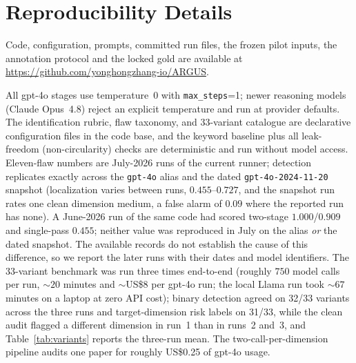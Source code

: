 \section{Reproducibility Details}
\label{app:repro}
\begin{sloppypar}\noindent Code, configuration, prompts, committed run files, the
frozen pilot inputs, the annotation protocol and the locked gold are available
at \url{https://github.com/yonghongzhang-io/ARGUS}.\end{sloppypar}


All gpt-4o stages use temperature~$0$ with \texttt{max\_steps}{=}1; newer
reasoning models (Claude Opus~4.8) reject an explicit temperature and run at
provider defaults. The identification rubric, flaw taxonomy, and
33-variant catalogue are declarative configuration files in the code base, and
the keyword baseline plus all leak-freedom (non-circularity) checks are
deterministic and run without model access. Eleven-flaw numbers are July-2026
runs of the current runner; detection replicates exactly across the
\texttt{gpt-4o} alias and the dated \texttt{gpt-4o-2024-11-20} snapshot
(localization varies between runs, $0.455$--$0.727$, and the snapshot run
rates one clean dimension medium, a false alarm of $0.09$ where the reported
run has none). A June-2026 run of the
same code had scored two-stage $1.000$/$0.909$ and single-pass $0.455$; neither
value was reproduced in July on the alias \emph{or} the dated snapshot. The
available records do not establish the cause of this difference, so we report
the later runs with their dates and model identifiers. The 33-variant benchmark was run three
times end-to-end (roughly $750$ model calls per run, ${\sim}20$ minutes and
${\sim}$US\$8 per gpt-4o run; the local Llama run took ${\sim}67$ minutes on a
laptop at zero API cost); binary detection agreed on 32/33 variants across the
three runs and target-dimension risk labels on 31/33, while the clean audit
flagged a different dimension in run~1 than in runs~2 and~3, and Table~\ref{tab:variants} reports the three-run mean. The
two-call-per-dimension pipeline audits one paper for roughly US\$0.25 of
gpt-4o usage.

